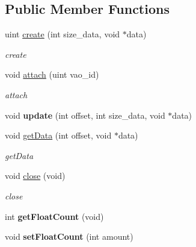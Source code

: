 \subsection*{Public Member Functions}
\begin{DoxyCompactItemize}
\item 
uint \hyperlink{classEngine_1_1GLElementBuffer_a36ddf0be23d19af69b60b0a1502768c5}{create} (int size\+\_\+data, void $\ast$data)
\begin{DoxyCompactList}\small\item\em create \end{DoxyCompactList}\item 
void \hyperlink{classEngine_1_1GLElementBuffer_a12e74567261194e53b9b58b52ff91da4}{attach} (uint vao\+\_\+id)
\begin{DoxyCompactList}\small\item\em attach \end{DoxyCompactList}\item 
\hypertarget{classEngine_1_1GLElementBuffer_a1128832938db430f2cb97e3e18d66cac}{}void {\bfseries update} (int offset, int size\+\_\+data, void $\ast$data)\label{classEngine_1_1GLElementBuffer_a1128832938db430f2cb97e3e18d66cac}

\item 
void \hyperlink{classEngine_1_1GLElementBuffer_a78842b1b2910f198665096b72186a1be}{get\+Data} (int offset, void $\ast$data)
\begin{DoxyCompactList}\small\item\em get\+Data \end{DoxyCompactList}\item 
void \hyperlink{classEngine_1_1GLElementBuffer_a8d46099a8a43d1ac1217e765863997ea}{close} (void)
\begin{DoxyCompactList}\small\item\em close \end{DoxyCompactList}\item 
\hypertarget{classEngine_1_1GLElementBuffer_a24aea14bff4e6ac3d34d06d2132d34f2}{}int {\bfseries get\+Float\+Count} (void)\label{classEngine_1_1GLElementBuffer_a24aea14bff4e6ac3d34d06d2132d34f2}

\item 
\hypertarget{classEngine_1_1GLElementBuffer_aa864f1bbd2aba4cd327b0e8a485fceb5}{}void {\bfseries set\+Float\+Count} (int amount)\label{classEngine_1_1GLElementBuffer_aa864f1bbd2aba4cd327b0e8a485fceb5}

\end{DoxyCompactItemize}
